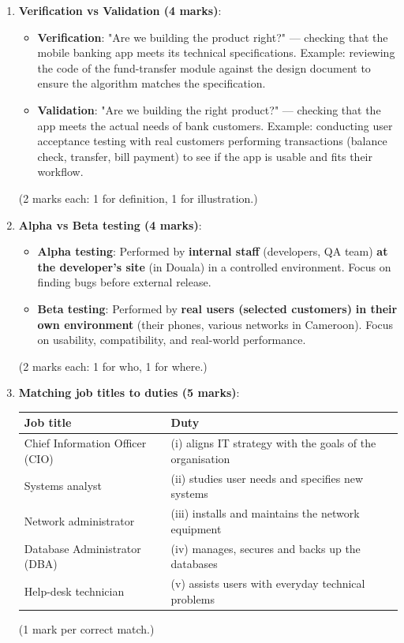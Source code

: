 \documentclass[11pt]{article}
\begin{document}
\begin{corrige}
\begin{enumerate}
\item \textbf{Verification vs Validation (4 marks)}:
\begin{itemize}
\item \textbf{Verification}: "Are we building the product right?" — checking that the mobile banking app meets its technical specifications. Example: reviewing the code of the fund-transfer module against the design document to ensure the algorithm matches the specification.
\item \textbf{Validation}: "Are we building the right product?" — checking that the app meets the actual needs of bank customers. Example: conducting user acceptance testing with real customers performing transactions (balance check, transfer, bill payment) to see if the app is usable and fits their workflow.
\end{itemize}
(2 marks each: 1 for definition, 1 for illustration.)

\item \textbf{Alpha vs Beta testing (4 marks)}:
\begin{itemize}
\item \textbf{Alpha testing}: Performed by \textbf{internal staff} (developers, QA team) \textbf{at the developer's site} (in Douala) in a controlled environment. Focus on finding bugs before external release.
\item \textbf{Beta testing}: Performed by \textbf{real users (selected customers)} \textbf{in their own environment} (their phones, various networks in Cameroon). Focus on usability, compatibility, and real-world performance.
\end{itemize}
(2 marks each: 1 for who, 1 for where.)

\item \textbf{Matching job titles to duties (5 marks)}:
\begin{center}
\begin{tabular}{|l|l|}
\hline
\rowcolor{popblueL}
\textbf{Job title} & \textbf{Duty} \\
\hline
Chief Information Officer (CIO) & (i) aligns IT strategy with the goals of the organisation \\
Systems analyst & (ii) studies user needs and specifies new systems \\
Network administrator & (iii) installs and maintains the network equipment \\
Database Administrator (DBA) & (iv) manages, secures and backs up the databases \\
Help-desk technician & (v) assists users with everyday technical problems \\
\hline
\end{tabular}
\end{center}
(1 mark per correct match.)


\end{enumerate}
\end{corrige}
\end{document}
